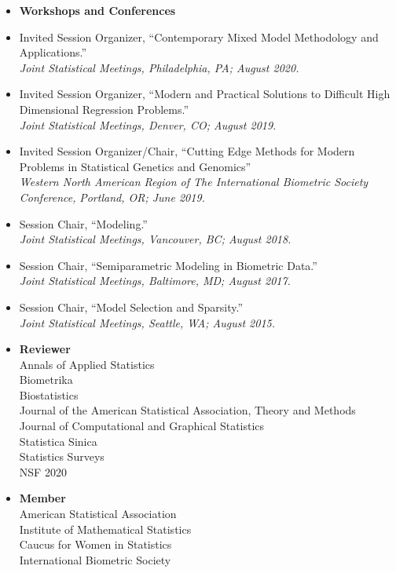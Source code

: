 \documentclass[11pt]{article}
\newcommand{\tab}{\hspace*{2em}}
\begin{document}
\begin{itemize} 
	\item[] \textbf{Workshops and Conferences}  \vspace{-2mm}
		\item[] Invited Session Organizer, ``Contemporary Mixed Model Methodology and Applications.'' \hfill   \\
	\tab \emph{Joint Statistical Meetings, Philadelphia, PA; August 2020.}  \vspace{-2mm}
	\item[] Invited Session Organizer, ``Modern and Practical Solutions to Difficult High Dimensional Regression Problems.'' \hfill   \\
	\tab \emph{Joint Statistical Meetings, Denver, CO; August 2019.}  \vspace{-2mm}
	\item[] Invited Session Organizer/Chair, ``Cutting Edge Methods for Modern Problems in Statistical Genetics and Genomics'' \hfill   \\
	\tab \emph{Western North American Region of The International Biometric Society Conference,} 
	\tab \emph{Portland, OR; June 2019.}  \vspace{-2mm}
	\item[] Session Chair, ``Modeling.'' \hfill   \\
	\tab \emph{Joint Statistical Meetings, Vancouver, BC; August 2018.}  \vspace{-2mm}
	\item[] Session Chair, ``Semiparametric Modeling in Biometric Data.'' \hfill   \\
	\tab \emph{Joint Statistical Meetings, Baltimore, MD; August 2017.}  \vspace{-2mm}
	\item[] Session Chair, ``Model Selection and Sparsity.'' \hfill   \\
	\tab \emph{Joint Statistical Meetings, Seattle, WA; August 2015.}  \vspace{-2mm}
\end{itemize}

\begin{itemize}
	\item[] \textbf{Reviewer}  \\
	\tab Annals of Applied Statistics \\ 
	\tab Biometrika \\
	\tab Biostatistics \\
	\tab Journal of the American Statistical Association, Theory and Methods \\
	\tab Journal of Computational and Graphical Statistics \\ 
	\tab Statistica Sinica \\
	\tab Statistics Surveys \\ 
	\tab NSF 2020 \vspace{-2mm}
	\item[] \textbf{Member} \\
	\tab American Statistical Association \\
	\tab  Institute of Mathematical Statistics \\
	\tab Caucus for Women in Statistics \\
	\tab  International Biometric Society 
\end{itemize}
\end{document}
